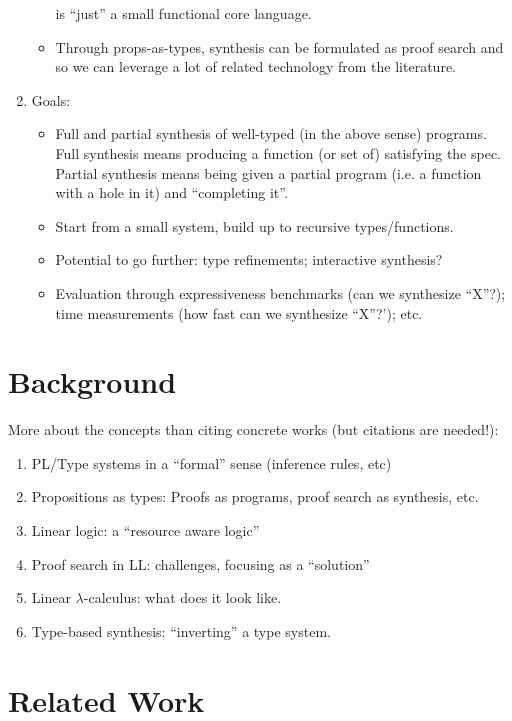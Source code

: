 \documentclass{llncs}
\begin{document}
\begin{enumerate}
\begin{itemize}
    is ``just'' a small functional core language.
  \item Through props-as-types, synthesis can be formulated as proof
    search and so we can leverage a lot of related technology from the
    literature.
  \end{itemize}
\item Goals:
  \begin{itemize}
\item Full and partial synthesis of well-typed (in the above sense)
  programs. Full synthesis means producing a function (or set of)
  satisfying the spec. Partial synthesis means being given a partial
  program (i.e. a function with a hole in it) and ``completing it''.
\item Start from a small system, build up to recursive
  types/functions.
\item Potential to go further: type refinements; interactive
  synthesis?
 \item Evaluation through expressiveness benchmarks (can we synthesize
   ``X''?); time measurements (how fast can we synthesize ``X''?');
   etc.
  \end{itemize}
   
\end{enumerate}

\section{Background}

More about the concepts than citing concrete works (but citations are
needed!):
\begin{enumerate}
\item PL/Type systems in a ``formal'' sense (inference rules, etc)
\item Propositions as types: Proofs as programs, proof search as
  synthesis, etc.
\item Linear logic: a ``resource aware logic''
\item Proof search in LL: challenges, focusing as a ``solution''
\item Linear $\lambda$-calculus: what does it look like.
\item Type-based synthesis: ``inverting'' a type system.
\end{enumerate}

\section{Related Work}
\end{document}
